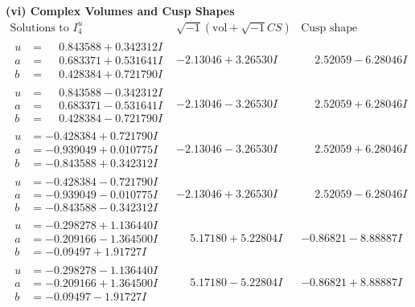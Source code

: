 \documentclass[1p]{elsarticle_modified}
\theoremstyle{definition}
\newcommand{\I}{\sqrt{-1}}
\begin{document}
\newpage\flushleft \textbf{(vi) Complex Volumes and Cusp Shapes}
$$\begin{array}{c|c|c}  
\text{Solutions to }I^u_{4}& \I (\text{vol} + \sqrt{-1}CS) & \text{Cusp shape}\\
 \hline 
\begin{aligned}
u &= \phantom{-}0.843588 + 0.342312 I \\
a &= \phantom{-}0.683371 + 0.531641 I \\
b &= \phantom{-}0.428384 + 0.721790 I\end{aligned}
 & -2.13046 + 3.26530 I & \phantom{-}2.52059 - 6.28046 I \\ \hline\begin{aligned}
u &= \phantom{-}0.843588 - 0.342312 I \\
a &= \phantom{-}0.683371 - 0.531641 I \\
b &= \phantom{-}0.428384 - 0.721790 I\end{aligned}
 & -2.13046 - 3.26530 I & \phantom{-}2.52059 + 6.28046 I \\ \hline\begin{aligned}
u &= -0.428384 + 0.721790 I \\
a &= -0.939049 + 0.010775 I \\
b &= -0.843588 + 0.342312 I\end{aligned}
 & -2.13046 - 3.26530 I & \phantom{-}2.52059 + 6.28046 I \\ \hline\begin{aligned}
u &= -0.428384 - 0.721790 I \\
a &= -0.939049 - 0.010775 I \\
b &= -0.843588 - 0.342312 I\end{aligned}
 & -2.13046 + 3.26530 I & \phantom{-}2.52059 - 6.28046 I \\ \hline\begin{aligned}
u &= -0.298278 + 1.136440 I \\
a &= -0.209166 - 1.364500 I \\
b &= -0.09497 + 1.91727 I\end{aligned}
 & \phantom{-}5.17180 + 5.22804 I & -0.86821 - 8.88887 I \\ \hline\begin{aligned}
u &= -0.298278 - 1.136440 I \\
a &= -0.209166 + 1.364500 I \\
b &= -0.09497 - 1.91727 I\end{aligned}
 & \phantom{-}5.17180 - 5.22804 I & -0.86821 + 8.88887 I \\ \hline\begin{aligned}

\end{aligned}
\end{array}$$
\end{document}
